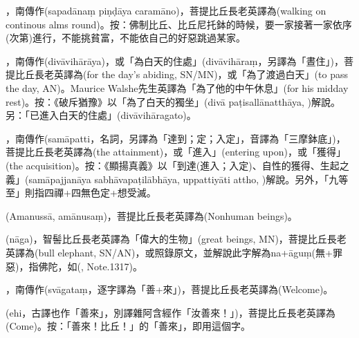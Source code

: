 \startitemgroup[noteitems]
\item{}，南傳作(sapadānaṃ piṇḍāya caramāno)，菩提比丘長老英譯為(walking on continous alms round)。按：佛制比丘、比丘尼托鉢的時候，要一家接著一家依序(次第)進行，不能挑貧富，不能依自己的好惡跳過某家。
\stopitemgroup

\startitemgroup[noteitems]
\item{}，南傳作(divāvihārāya)，或「為白天的住處」(divāvihāraṃ，另譯為「晝住」)，菩提比丘長老英譯為(for the day's abiding, SN/MN)，或「為了渡過白天」(to pass the day, AN)。Maurice Walshe先生英譯為「為了他的中午休息」(for his midday rest)。按：《破斥猶豫》以「為了白天的獨坐」(divā paṭisallānatthāya, )解說。另：「已進入白天的住處」(divāvihāragato)。
\stopitemgroup

\startitemgroup[noteitems]
\item{}，南傳作(samāpatti，名詞，另譯為「達到；定；入定」，音譯為「三摩鉢底」)，菩提比丘長老英譯為(the attainment)，或「進入」(entering upon)，或「獲得」(the acquisition)。按：《顯揚真義》以「到達(進入；入定)、自性的獲得、生起之義」(samāpajjanāya sabhāvapaṭilābhāya, uppattiyāti attho, )解說。另外，「九等至」則指四禪+四無色定+想受滅。
\stopitemgroup

\startitemgroup[noteitems]
\item{}(Amanussā, amānusaṃ)，菩提比丘長老英譯為(Nonhuman beings)。
\stopitemgroup

\startitemgroup[noteitems]
\item{}(nāga)，智髻比丘長老英譯為「偉大的生物」(great beings, MN)，菩提比丘長老英譯為(bull elephant, SN/AN)，或照錄原文，並解說此字解為na+āguṃ(無+罪惡)，指佛陀，如(, Note.1317)。
\stopitemgroup

\startitemgroup[noteitems]
\item{}，南傳作(svāgataṃ，逐字譯為「善+來」)，菩提比丘長老英譯為(Welcome)。
\item{}(ehi，古譯也作「善來」，別譯雜阿含經作「汝善來！」)，菩提比丘長老英譯為(Come)。按：「善來！比丘！」的「善來」，即用這個字。
\stopitemgroup


